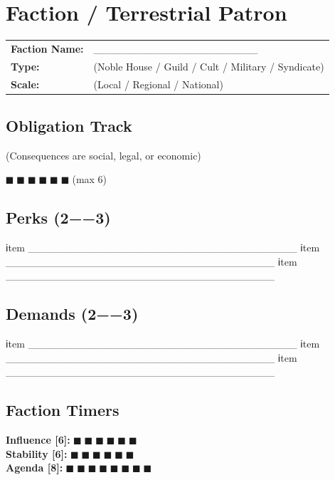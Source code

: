 \documentclass[11pt]{article}
\begin{document}
\section*{Faction / Terrestrial Patron}

\noindent
\begin{tabularx}{\textwidth}{X X}
\textbf{Faction Name:} & ______________________ \\
\textbf{Type:} & (Noble House / Guild / Cult / Military / Syndicate) \\
\textbf{Scale:} & (Local / Regional / National) \\
\end{tabularx}

\subsection*{Obligation Track}
(Consequences are social, legal, or economic)
\begin{center}
$■$ $■$ $■$ $■$ $■$ $■$ (max 6)
\end{center}

\subsection*{Perks (2−−3)}
\begin{itemize}
  ℹtem ____________________________________
  ℹtem ____________________________________
  ℹtem ____________________________________
\end{itemize}

\subsection*{Demands (2−−3)}
\begin{itemize}
  ℹtem ____________________________________
  ℹtem ____________________________________
  ℹtem ____________________________________
\end{itemize}

\subsection*{Faction Timers}
\textbf{Influence [6]:} $■$ $■$ $■$ $■$ $■$ $■$ \\
\textbf{Stability [6]:} $■$ $■$ $■$ $■$ $■$ $■$ \\
\textbf{Agenda [8]:} $■$ $■$ $■$ $■$ $■$ $■$ $■$ $■$
\end{document}
